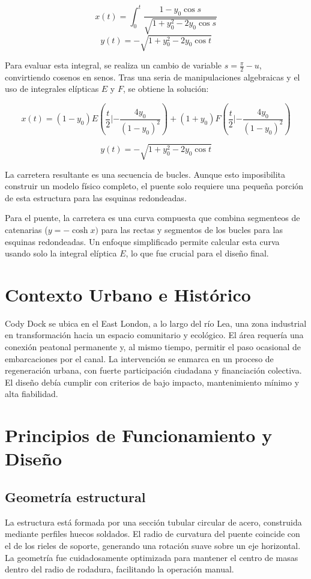 \documentclass{IEEEtran}
\begin{document}
\[ x(t) = \int_{0}^{t}\frac{1 - y_0 \cos s}{\sqrt{1 + y_0^2 - 2 y_0 \cos s}} \]
\[ y(t) = - \sqrt{1 + y_0^2 - 2 y_0 \cos t} \]

Para evaluar esta integral, se realiza un cambio de variable $s = \frac{\pi}{2} - u$, convirtiendo cosenos en senos. Tras una seria de manipulaciones algebraicas y el uso de integrales elípticas $E$ y $F$, se obtiene la solución:

\[ x(t) = (1 - y_0) E \left( \frac{t}{2} | - \frac{4y_0}{(1 - y_0)^2} \right) + (1 + y_0) F \left( \frac{t}{2} | - \frac{4 y_0}{(1 - y_0)^2} \right) \]

\[ y(t) = - \sqrt{1 + y_0^2 - 2 y_0 \cos t} \]

La carretera resultante es una secuencia de bucles. Aunque esto imposibilita construir un modelo físico completo, el puente solo requiere una pequeña porción de esta estructura para las esquinas redondeadas.

Para el puente, la carretera es una curva compuesta que combina segmenteos de catenarias ($y = - \cosh x)$ para las rectas y segmentos de los bucles para las esquinas redondeadas. Un enfoque simplificado permite calcular esta curva usando solo la integral elíptica $E$, lo que fue crucial para el diseño final.

\section{Contexto Urbano e Histórico}
Cody Dock se ubica en el East London, a lo largo del río Lea, una zona industrial en transformación hacia un espacio comunitario y ecológico. El área requería una conexión peatonal permanente y, al mismo tiempo, permitir el paso ocasional de embarcaciones por el canal. La intervención se enmarca en un proceso de regeneración urbana, con fuerte participación ciudadana y financiación colectiva. El diseño debía cumplir con criterios de bajo impacto, mantenimiento mínimo y alta fiabilidad.

\section{Principios de Funcionamiento y Diseño}
\subsection{Geometría estructural}
La estructura está formada por una sección tubular circular de acero, construida mediante perfiles huecos soldados. El radio de curvatura del puente coincide con el de los rieles de soporte, generando una rotación suave sobre un eje horizontal. La geometría fue cuidadosamente optimizada para mantener el centro de masas dentro del radio de rodadura, facilitando la operación manual.
\end{document}
